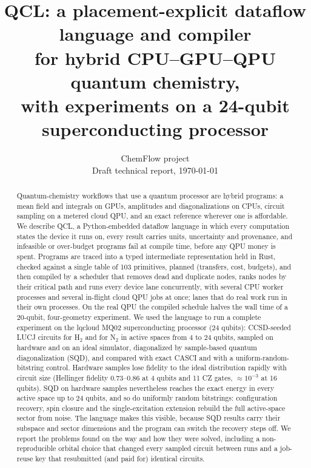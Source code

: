\documentclass[10pt]{article}
\title{\Large\textbf{QCL: a placement-explicit dataflow language and compiler\\
for hybrid CPU--GPU--QPU quantum chemistry,\\
with experiments on a 24-qubit superconducting processor}}
\author{ChemFlow project\\\small Draft technical report, \today}
\date{}
\newcommand{\qcl}{QCL}
\begin{document}
\maketitle

\begin{abstract}
Quantum-chemistry workflows that use a quantum processor are hybrid programs: a mean
field and integrals on GPUs, amplitudes and diagonalizations on CPUs, circuit sampling
on a metered cloud QPU, and an exact reference wherever one is affordable. We describe
\qcl{}, a Python-embedded dataflow language in which every computation states the device
it runs on, every result carries units, uncertainty and provenance, and infeasible or
over-budget programs fail at compile time, before any QPU money is spent. Programs are
traced into a typed intermediate representation held in Rust, checked against a single
table of 103 primitives, planned (transfers, cost, budgets), and then compiled by a
scheduler that removes dead and duplicate nodes, ranks nodes by their critical path and
runs every device lane concurrently, with several CPU worker processes and several
in-flight cloud QPU jobs at once; lanes that do real work run in their own processes.
On the real QPU the compiled schedule halves the wall time of a 20-qubit, four-geometry
experiment. We used the language to run a complete experiment on
the lqcloud MQ02 superconducting processor (24 qubits): CCSD-seeded LUCJ circuits for
H$_2$ and for N$_2$ in active spaces from 4 to 24 qubits, sampled on hardware and on an
ideal simulator, diagonalized by sample-based quantum diagonalization (SQD), and compared
with exact CASCI and with a uniform-random-bitstring control. Hardware samples lose
fidelity to the ideal distribution rapidly with circuit size (Hellinger fidelity
0.73--0.86 at 4 qubits and 11 CZ gates, $\approx 10^{-3}$ at 16 qubits). SQD on hardware
samples nevertheless reaches the exact energy in every active space up to 24 qubits, and
so do uniformly random bitstrings: configuration recovery, spin closure and the
single-excitation extension rebuild the full active-space sector from noise. The language
makes this visible, because SQD results carry their subspace and sector dimensions and
the program can switch the recovery steps off. We report the problems found on the way
and how they were solved, including a non-reproducible orbital choice that changed every
sampled circuit between runs and a job-reuse key that resubmitted (and paid for)
identical circuits.
\end{abstract}
\end{document}
